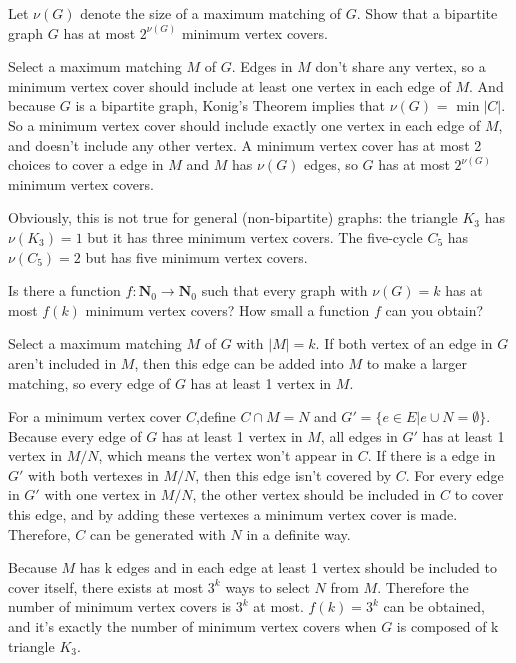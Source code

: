 \documentclass[11pt,a4paper,oneside]{article}
\begin{document}
\begin{problem}{6}
	\statement
    Let $\nu(G)$ denote the size of a maximum matching of $G$. Show that a bipartite graph $G$
    has at most $2^{\nu(G)}$ minimum vertex covers.
    
    \solution
    Select a maximum matching $M$ of $G$. 
    Edges in $M$ don't share any vertex, so a minimum vertex cover should include at least one vertex in each edge of $M$. 
	And because $G$ is a bipartite graph, Konig's Theorem implies that $\nu(G)$ = $\min|C|$. 
    So a minimum vertex cover should include exactly one vertex in each edge of $M$, and doesn't include any other vertex. 
    A minimum vertex cover has at most 2 choices to cover a edge in $M$ and $M$ has $\nu(G)$ edges, 
    so $G$ has at most $2^{\nu(G)}$ minimum vertex covers. 
\end{problem}

Obviously, this is not  true for general (non-bipartite) graphs: the triangle $K_3$ has $\nu(K_3) = 1$ but it has 
three minimum vertex covers. The five-cycle $C_5$ has $\nu(C_5) = 2$ but has five minimum vertex covers.

\begin{problem}{7}
	\statement
   Is there a function $f: \mathbf{N}_0 \rightarrow \mathbf{N}_0$ such that every graph with $\nu(G) = k$ has 
   at most $f(k)$ minimum vertex covers? How small a function $f$ can you obtain?
   
    \solution   
    Select a maximum matching $M$ of $G$ with $|M|=k$. 
    If both vertex of an edge in $G$ aren't included in $M$, then this edge can be added into $M$ to make a larger matching, 
    so every edge of $G$ has at least 1 vertex in $M$.
    
	
	For a minimum vertex cover $C$,define $C\cap M = N$ and $G'=\{ e\in E | e\cup N=\emptyset\}$. 
	Because every edge of $G$ has at least 1 vertex in $M$, all edges in $G'$ has at least 1 vertex in $M/N$, which means the vertex won't appear in $C$. 
	If there is a edge in $G'$ with both vertexes in $M/N$, then this edge isn't covered by $C$. 
	For every edge in $G'$ with one vertex in $M/N$, the other vertex should be included in $C$ to cover this edge, 
	and by adding these vertexes a minimum vertex cover is made.
	Therefore, $C$ can be generated with $N$ in a definite way.

	Because $M$ has k edges and in each edge at least 1 vertex should be included to cover itself, there exists at most $3^k$ ways to select $N$ from $M$.
	Therefore the number of minimum vertex covers is $3^k$ at most.
	$f(k)=3^k$ can be obtained, and it's exactly the number of minimum vertex covers when $G$ is composed of k triangle $K_3$.
\end{problem}
\end{document}
